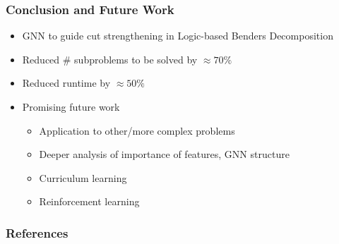 \documentclass[aspectratio=1610]{beamer}
\newcommand{\important}[1]{{\color{green!60!black}#1}}
\let\oldfootnotesize\footnotesize
\renewcommand*{\footnotesize}{\oldfootnotesize\fontsize{6}{4}\selectfont}
\renewcommand{\footnotesize}{\scriptsize}
\begin{document}
\begin{frame}
	\frametitle{Conclusion and Future Work}
	\begin{itemize}
	\itemsep1.5ex
	\item \important{GNN} to \important{guide cut strengthening} in Logic-based Benders Decomposition
	\item Reduced \# subproblems to be solved by $\approx 70\%$
	\item Reduced runtime by $\approx 50\%$
	\item Promising future work
		\begin{itemize}
		\item Application to other/more complex problems
		\item Deeper analysis of importance of features, GNN structure
		\item Curriculum learning
		\item Reinforcement learning
		\end{itemize}
	\end{itemize}
\end{frame}




\begin{frame}[allowframebreaks]
	\frametitle{References}
	\footnotesize
	
	
\end{frame}
\end{document}
